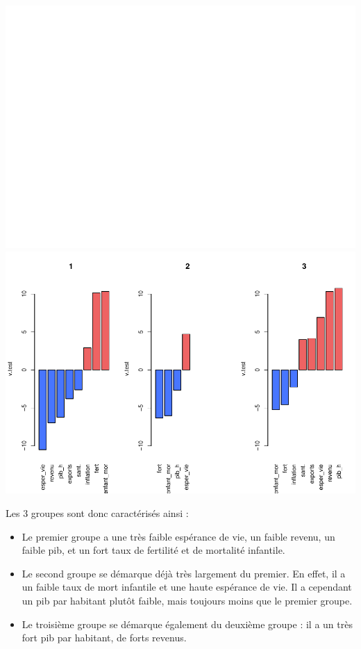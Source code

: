 \documentclass[
]{article}
\begin{document}
\includegraphics{Projet_files/figure-latex/unnamed-chunk-23-1.pdf}
\includegraphics{Projet_files/figure-latex/unnamed-chunk-23-2.pdf}

Les 3 groupes sont donc caractérisés ainsi :

\begin{itemize}
\item
  Le premier groupe a une très faible espérance de vie, un faible
  revenu, un faible pib, et un fort taux de fertilité et de mortalité
  infantile.
\item
  Le second groupe se démarque déjà très largement du premier. En effet,
  il a un faible taux de mort infantile et une haute espérance de vie.
  Il a cependant un pib par habitant plutôt faible, mais toujours moins
  que le premier groupe.
\item
  Le troisième groupe se démarque également du deuxième groupe : il a un
  très fort pib par habitant, de forts revenus.
\end{itemize}
\end{document}
